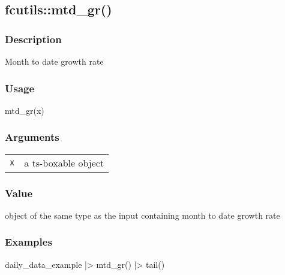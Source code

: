 \documentclass[
  letterpaper,
  DIV=11,
  numbers=noendperiod]{scrreport}
\newenvironment{Shaded}{\begin{snugshade}}{\end{snugshade}}
\newcommand{\FunctionTok}[1]{\textcolor[rgb]{0.28,0.35,0.67}{#1}}
\newcommand{\NormalTok}[1]{\textcolor[rgb]{0.00,0.23,0.31}{#1}}
\newcommand{\SpecialCharTok}[1]{\textcolor[rgb]{0.37,0.37,0.37}{#1}}
\begin{document}
\subsection{fcutils::mtd\_gr()}\label{fcutilsmtd_gr}

\subsubsection{Description}\label{description-40}

Month to date growth rate

\subsubsection{Usage}\label{usage-40}

\begin{Shaded}
\begin{Highlighting}[]
\FunctionTok{mtd\_gr}\NormalTok{(x)}
\end{Highlighting}
\end{Shaded}

\subsubsection{Arguments}\label{arguments-40}

\begin{longtable}[]{@{}ll@{}}
\toprule\noalign{}
\endhead
\bottomrule\noalign{}
\endlastfoot
\texttt{x} & a ts-boxable object \\
\end{longtable}

\subsubsection{Value}\label{value-40}

object of the same type as the input containing month to date growth
rate

\subsubsection{Examples}\label{examples-40}

\begin{Shaded}
\begin{Highlighting}[]
\NormalTok{daily\_data\_example }\SpecialCharTok{|\textgreater{}}
  \FunctionTok{mtd\_gr}\NormalTok{() }\SpecialCharTok{|\textgreater{}}
  \FunctionTok{tail}\NormalTok{()}
\end{Highlighting}
\end{Shaded}
\end{document}

